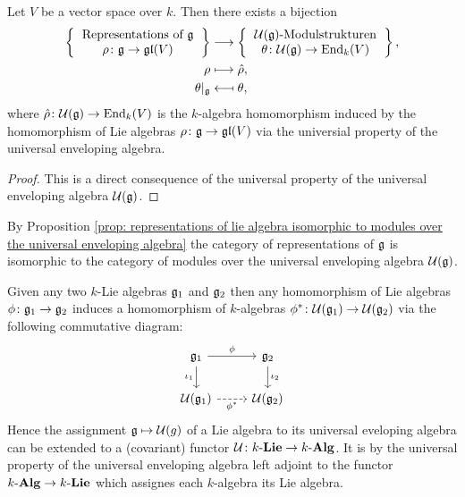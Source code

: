 \begin{prop}\label{prop: representations of lie algebra isomorphic to modules over the universal enveloping algebra}
 Let $V$ be a vector space over $k$. Then there exists a bijection
 \begin{align*}
  \left\{
   \begin{tabular}{c}
    Representations of $\g$ \\
    $\rho \colon \g \to \gl(V)$
   \end{tabular}
  \right\}
  &\longrightarrow
  \left\{
   \begin{tabular}{c}
    $\Ue(\g)$-Modulstrukturen \\
    $\theta \colon \Ue(\g) \to \End_k(V)$
   \end{tabular}
  \right\}, \\
          \rho &\longmapsto   \hat{\rho}, \\
  \theta|_{\g} &\longmapsfrom \theta,
 \end{align*}
 where $\hat{\rho} \colon \mathcal{U}(\mathfrak{g}) \to \operatorname{End}_k(V)$ is the $k$-algebra homomorphism induced by the homomorphism of Lie algebras $\rho \colon \mathfrak{g} \to \mathfrak{gl}(V)$ via the universial property of the universal enveloping algebra.
\end{prop}
\begin{proof}
 This is a direct consequence of the universal property of the universal enveloping algebra $\mathcal{U}(\mathfrak{g})$.
\end{proof}


\begin{rem}
 By Proposition \ref{prop: representations of lie algebra isomorphic to modules over the universal enveloping algebra} the category of representations of $\mathfrak{g}$ is isomorphic to the category of modules over the universal enveloping algebra $\mathcal{U}(\mathfrak{g})$.
\end{rem}


\begin{rem}
 Given any two $k$-Lie algebras $\mathfrak{g}_1$ and $\mathfrak{g}_2$ then any homomorphism of Lie algebras $\phi \colon \mathfrak{g}_1 \to \mathfrak{g}_2$ induces a homomorphism of $k$-algebras $\phi^* \colon \mathcal{U}(\mathfrak{g}_1) \to \mathcal{U}(\mathfrak{g}_2)$ via the following commutative diagram:
 \[
   \begin{tikzcd}
     \g_1
     \arrow{r}[above]{\phi}
     \arrow{d}[left]{\iota_1}
     &
     \g_2
     \arrow{d}[right]{\iota_2}
     \\
     \Ue(\g_1)
     \arrow[dashed]{r}[below]{\phi^*}
     &
     \Ue(\g_2)
   \end{tikzcd}
 \]
 Hence the assignment $\mathfrak{g} \mapsto \mathcal{U}(g)$ of a Lie algebra to its universal eveloping algebra can be extended to a (covariant) functor $\mathcal{U} \colon k\text{-}\mathbf{Lie} \to k\text{-}\mathbf{Alg}$. It is by the universal property of the universal enveloping algebra left adjoint to the functor $k\text{-}\mathbf{Alg} \to k\text{-}\mathbf{Lie}$ which assignes each $k$-algebra its Lie algebra.
\end{rem}




